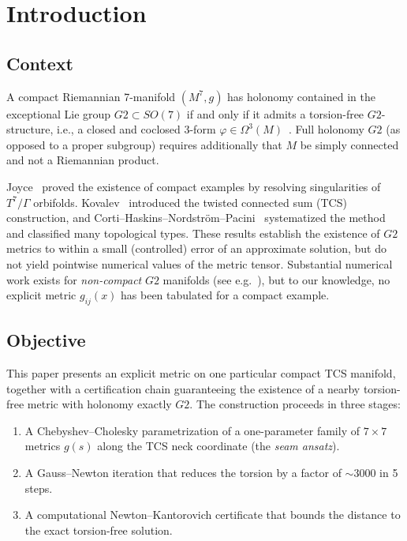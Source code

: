 \documentclass[11pt,a4paper]{article}
\newcommand{\Gtwo}{\mathrm{G}_2}
\newcommand{\SO}{\mathrm{SO}}
\theoremstyle{remark}
\def\Gtwo{G2}%
\def\SO{SO}%
\begin{document}
\section{Introduction}\label{sec:intro}

\subsection{Context}\label{sec:context}

A compact Riemannian 7-manifold $(M^7, g)$ has holonomy contained in the exceptional
Lie group $\Gtwo \subset \SO(7)$ if and only if it admits a torsion-free $\Gtwo$-structure, i.e., a
closed and coclosed 3-form $\varphi \in \Omega^3(M)$~\cite{harvey1982, bryant1987}. Full holonomy $\Gtwo$ (as opposed to a
proper subgroup) requires additionally that $M$ be simply connected and not a
Riemannian product.

Joyce~\cite{joyce1996, joyce2000} proved the existence of compact examples by resolving singularities of
$T^7/\Gamma$ orbifolds. Kovalev~\cite{kovalev2003} introduced the twisted connected sum (TCS) construction,
and Corti--Haskins--Nordstr\"om--Pacini~\cite{chnp2015} systematized the method and classified many
topological types. These results establish the existence of $\Gtwo$ metrics to within a
small (controlled) error of an approximate solution, but do not yield pointwise
numerical values of the metric tensor. Substantial numerical work exists for
\textit{non-compact} $\Gtwo$ manifolds (see e.g.~\cite{brandhuber2001}), but to our knowledge, no explicit metric
$g_{ij}(x)$ has been tabulated for a compact example.

\subsection{Objective}\label{sec:objective}

This paper presents an explicit metric on one particular compact TCS manifold,
together with a certification chain guaranteeing the existence of a nearby
torsion-free metric with holonomy exactly $\Gtwo$. The construction proceeds in three
stages:

\begin{enumerate}
    \item A Chebyshev--Cholesky parametrization of a one-parameter family of $7 \times 7$ metrics
          $g(s)$ along the TCS neck coordinate (the \textit{seam ansatz}).
    \item A Gauss--Newton iteration that reduces the torsion by a factor of ${\sim}3000$ in 5 steps.
    \item A computational Newton--Kantorovich certificate that bounds the distance to the
          exact torsion-free solution.
\end{enumerate}
\end{document}
